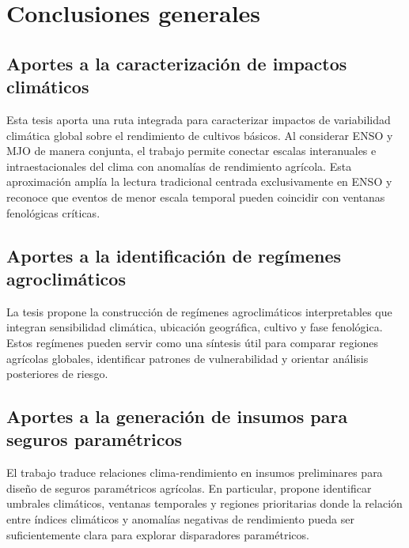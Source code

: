 \chapter{Conclusiones generales}

\section{Aportes a la caracterización de impactos climáticos}

Esta tesis aporta una ruta integrada para caracterizar impactos de variabilidad climática global sobre el rendimiento de cultivos básicos. Al considerar ENSO y MJO de manera conjunta, el trabajo permite conectar escalas interanuales e intraestacionales del clima con anomalías de rendimiento agrícola. Esta aproximación amplía la lectura tradicional centrada exclusivamente en ENSO y reconoce que eventos de menor escala temporal pueden coincidir con ventanas fenológicas críticas.


\section{Aportes a la identificación de regímenes agroclimáticos}

La tesis propone la construcción de regímenes agroclimáticos interpretables que integran sensibilidad climática, ubicación geográfica, cultivo y fase fenológica. Estos regímenes pueden servir como una síntesis útil para comparar regiones agrícolas globales, identificar patrones de vulnerabilidad y orientar análisis posteriores de riesgo.


\section{Aportes a la generación de insumos para seguros paramétricos}

El trabajo traduce relaciones clima-rendimiento en insumos preliminares para diseño de seguros paramétricos agrícolas. En particular, propone identificar umbrales climáticos, ventanas temporales y regiones prioritarias donde la relación entre índices climáticos y anomalías negativas de rendimiento pueda ser suficientemente clara para explorar disparadores paramétricos.

